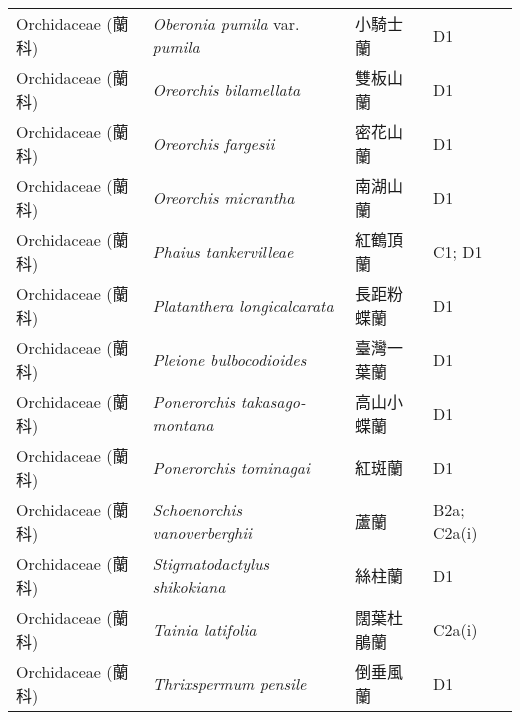 \begin{longtable}{p{3cm}p{5cm}p{3cm}p{4cm}}
    Orchidaceae (蘭科) & \textit{Oberonia pumila} var. \textit{pumila}  & 小騎士蘭 & D1 \index{Oberonia@\textit{Oberonia}!pumila@\textit{pumila}!var. pumila@var. \textit{pumila}}  \index{小騎士蘭} \\
    Orchidaceae (蘭科) & \textit{Oreorchis bilamellata}  & 雙板山蘭 & D1 \index{Oreorchis@\textit{Oreorchis}!bilamellata@\textit{bilamellata}}  \index{雙板山蘭} \\
    Orchidaceae (蘭科) & \textit{Oreorchis fargesii}  & 密花山蘭 & D1 \index{Oreorchis@\textit{Oreorchis}!fargesii@\textit{fargesii}}  \index{密花山蘭} \\
    Orchidaceae (蘭科) & \textit{Oreorchis micrantha}  & 南湖山蘭 & D1 \index{Oreorchis@\textit{Oreorchis}!micrantha@\textit{micrantha}}  \index{南湖山蘭} \\
    Orchidaceae (蘭科) & \textit{Phaius tankervilleae}  & 紅鶴頂蘭 & C1; D1 \index{Phaius@\textit{Phaius}!tankervilleae@\textit{tankervilleae}}  \index{紅鶴頂蘭} \\
    Orchidaceae (蘭科) & \textit{Platanthera longicalcarata}  & 長距粉蝶蘭 & D1 \index{Platanthera@\textit{Platanthera}!longicalcarata@\textit{longicalcarata}}  \index{長距粉蝶蘭} \\
    Orchidaceae (蘭科) & \textit{Pleione bulbocodioides}  & 臺灣一葉蘭 & D1 \index{Pleione@\textit{Pleione}!bulbocodioides@\textit{bulbocodioides}}  \index{臺灣一葉蘭} \\
    Orchidaceae (蘭科) & \textit{Ponerorchis takasago-montana}  & 高山小蝶蘭 & D1 \index{Ponerorchis@\textit{Ponerorchis}!takasago-montana@\textit{takasago-montana}}  \index{高山小蝶蘭} \\
    Orchidaceae (蘭科) & \textit{Ponerorchis tominagai}  & 紅斑蘭 & D1 \index{Ponerorchis@\textit{Ponerorchis}!tominagai@\textit{tominagai}}  \index{紅斑蘭} \\
    Orchidaceae (蘭科) & \textit{Schoenorchis vanoverberghii}  & 蘆蘭 & B2a; C2a(i) \index{Schoenorchis@\textit{Schoenorchis}!vanoverberghii@\textit{vanoverberghii}}  \index{蘆蘭} \\
    Orchidaceae (蘭科) & \textit{Stigmatodactylus shikokiana}  & 絲柱蘭 & D1 \index{Stigmatodactylus@\textit{Stigmatodactylus}!shikokiana@\textit{shikokiana}}  \index{絲柱蘭} \\
    Orchidaceae (蘭科) & \textit{Tainia latifolia}  & 闊葉杜鵑蘭 & C2a(i) \index{Tainia@\textit{Tainia}!latifolia@\textit{latifolia}}  \index{闊葉杜鵑蘭} \\
    Orchidaceae (蘭科) & \textit{Thrixspermum pensile}  & 倒垂風蘭 & D1 \index{Thrixspermum@\textit{Thrixspermum}!pensile@\textit{pensile}}  \index{倒垂風蘭} \\

\end{longtable}
